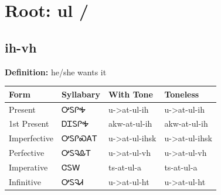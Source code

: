 \documentclass{article}%
\begin{document}
%
\normalsize%
\section*{Root: ul / }%
\subsection*{ih-vh}%
\textbf{Definition: }%
he/she wants it%
\\[0.5em]%
\begin{tabular}{|l|l|l|l|}%
\hline%
\textbf{Form}&\textbf{Syllabary}&\textbf{With Tone}&\textbf{Toneless}\\%
\hline%
Present&ᎤᏚᎵᎭ&u{-}>at{-}ul{-}ih&u{-}>at{-}ul{-}ih\\%
1st Present&ᎠᏆᏚᎵᎭ&akw{-}at{-}ul{-}ih&akw{-}at{-}ul{-}ih\\%
Imperfective&ᎤᏚᎵᏍᎪᎢ&u{-}>at{-}ul{-}ihsk&u{-}>at{-}ul{-}ihsk\\%
Perfective&ᎤᏚᎸᎲᎢ&u{-}>at{-}ul{-}vh&u{-}>at{-}ul{-}vh\\%
Imperative&ᏣᏚᎳ&ts{-}at{-}ul{-}a&ts{-}at{-}ul{-}a\\%
Infinitive&ᎤᏚᎸᏗ&u{-}>at{-}ul{-}ht&u{-}>at{-}ul{-}ht\\%
\hline%
\end{tabular}%
\\[1em]%
\end{document}
